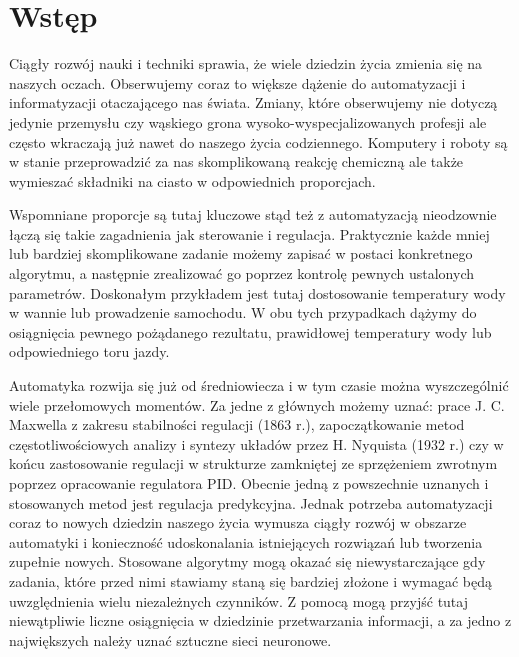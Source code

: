 \newpage %
\section{Wstęp}

\par Ciągły rozwój nauki i techniki sprawia, że wiele dziedzin życia zmienia się na naszych oczach. Obserwujemy coraz to większe dążenie do automatyzacji i informatyzacji otaczającego nas świata. Zmiany, które obserwujemy nie dotyczą jedynie przemysłu czy wąskiego grona wysoko-wyspecjalizowanych profesji ale często wkraczają już nawet do naszego życia codziennego. Komputery i roboty są  w stanie przeprowadzić za nas skomplikowaną reakcję chemiczną ale także wymieszać składniki na ciasto w odpowiednich proporcjach. 

\par Wspomniane proporcje są tutaj kluczowe stąd też z automatyzacją nieodzownie łączą się takie zagadnienia jak sterowanie i regulacja. Praktycznie każde mniej lub bardziej skomplikowane zadanie możemy zapisać w postaci konkretnego algorytmu, a następnie zrealizować go poprzez kontrolę pewnych ustalonych parametrów. Doskonałym przykładem jest tutaj dostosowanie temperatury wody w wannie lub prowadzenie samochodu. W obu tych przypadkach dążymy do osiągnięcia pewnego pożądanego rezultatu, prawidłowej temperatury wody lub odpowiedniego toru jazdy.

\par Automatyka rozwija się już od średniowiecza i w tym czasie można wyszczególnić wiele przełomowych momentów. Za jedne z głównych możemy uznać: prace J. C. Maxwella z zakresu stabilności regulacji (1863 r.), zapoczątkowanie metod częstotliwościowych analizy i syntezy układów przez H. Nyquista (1932 r.) czy w końcu zastosowanie regulacji w strukturze zamkniętej ze sprzężeniem zwrotnym poprzez opracowanie regulatora PID. Obecnie jedną z powszechnie uznanych i stosowanych metod jest regulacja predykcyjna. Jednak potrzeba automatyzacji coraz to nowych dziedzin naszego życia wymusza ciągły rozwój w obszarze automatyki i konieczność udoskonalania istniejących rozwiązań lub tworzenia zupełnie nowych. Stosowane algorytmy mogą okazać się niewystarczające gdy zadania, które przed nimi stawiamy staną się bardziej złożone i wymagać będą uwzględnienia wielu niezależnych czynników. Z pomocą mogą przyjść tutaj niewątpliwie liczne osiągnięcia w dziedzinie przetwarzania informacji, a za jedno z największych należy uznać sztuczne sieci neuronowe.

